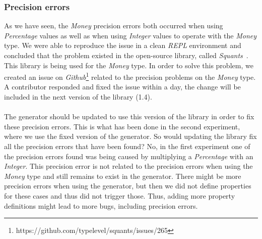 \subsubsection{Precision errors}
As we have seen, the \textit{Money} precision errors both occurred when using
\textit{Percentage} values as well as when using \textit{Integer} values to
operate with the \textit{Money} type. We were able to reproduce the issue
in a clean \textit{REPL} environment and concluded that the problem existed in the open-source
library, called \textit{Squants}~\cite{siteSquants2017}. This library is being used for the \textit{Money} type. In
order to solve this problem, we created an issue on
\textit{Github}\footnote{https://github.com/typelevel/squants/issues/265}
related to the precision problems on the \textit{Money} type. A contributor
responded and fixed the issue within a day, the change will be included in the
next version of the library (1.4).\\
\\
The generator should be updated to use this version of the library in order to
fix these precision errors. This is what has been done in the second experiment,
where we use the fixed version of the generator. So would updating the library
fix all the precision errors that have been found? No, in the first experiment
one of the precision errors found was being caused by multiplying a
\textit{Percentage} with an \textit{Integer}. This precision error is not
related to the precision errors when using the \textit{Money} type and still
remains to exist in the generator. There might be more precision errors when
using the generator, but then we did not define properties for these cases and
thus did not trigger those. Thus, adding more property definitions might lead to
more bugs, including precision errors.

